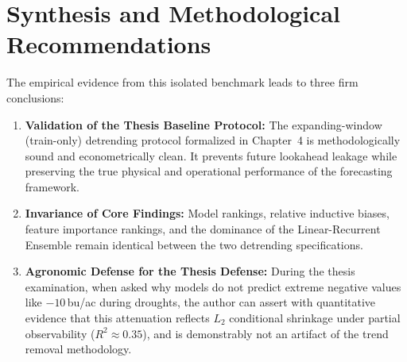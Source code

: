 \documentclass[11pt,a4paper]{article}
\begin{document}
\section{Synthesis and Methodological Recommendations}

The empirical evidence from this isolated benchmark leads to three firm conclusions:
\begin{enumerate}
    \item \textbf{Validation of the Thesis Baseline Protocol:} The expanding-window (train-only) detrending protocol formalized in Chapter~4 is methodologically sound and econometrically clean. It prevents future lookahead leakage while preserving the true physical and operational performance of the forecasting framework.
    \item \textbf{Invariance of Core Findings:} Model rankings, relative inductive biases, feature importance rankings, and the dominance of the Linear-Recurrent Ensemble remain identical between the two detrending specifications.
    \item \textbf{Agronomic Defense for the Thesis Defense:} During the thesis examination, when asked why models do not predict extreme negative values like $-10$\,bu/ac during droughts, the author can assert with quantitative evidence that this attenuation reflects $L_2$ conditional shrinkage under partial observability ($R^2 \approx 0.35$), and is demonstrably not an artifact of the trend removal methodology.
\end{enumerate}
\end{document}
